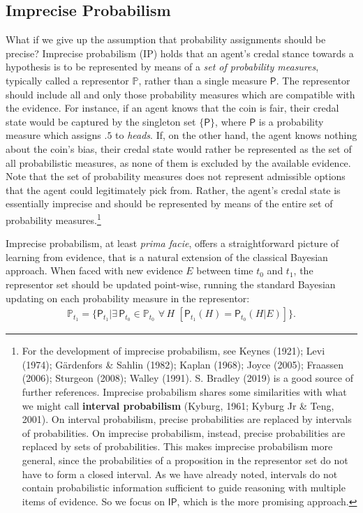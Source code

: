 \documentclass[
  10pt,
  dvipsnames,enabledeprecatedfontcommands]{scrartcl}
\newcommand{\s}[1]{\mbox{$\mathsf{#1}$}}
\begin{document}
\hypertarget{imprecise-probabilism}{%
\subsection{Imprecise Probabilism}\label{imprecise-probabilism}}

What if we give up the assumption that probability assignments should be
precise? Imprecise probabilism (\textsf{IP}) holds that an agent's
credal stance towards a hypothesis is to be represented by means of a
\emph{set of probability measures}, typically called a representor
\(\mathbb{P}\), rather than a single measure \(\mathsf{P}\). The
representor should include all and only those probability measures which
are compatible with the evidence. For instance, if an agent knows that
the coin is fair, their credal state would be captured by the singleton
set \(\{\mathsf{P}\}\), where \(\mathsf{P}\) is a probability measure
which assigns \(.5\) to \emph{heads}. If, on the other hand, the agent
knows nothing about the coin's bias, their credal state would rather be
represented as the set of all probabilistic measures, as none of them is
excluded by the available evidence. Note that the set of probability
measures does not represent admissible options that the agent could
legitimately pick from. Rather, the agent's credal state is essentially
imprecise and should be represented by means of the entire set of
probability measures.\footnote{For the development of imprecise
  probabilism, see Keynes (1921); Levi (1974); Gärdenfors \& Sahlin
  (1982); Kaplan (1968); Joyce (2005); Fraassen (2006); Sturgeon (2008);
  Walley (1991). S. Bradley (2019) is a good source of further
  references. Imprecise probabilism shares some similarities with what
  we might call \textbf{interval probabilism} (Kyburg, 1961; Kyburg Jr
  \& Teng, 2001). On interval probabilism, precise probabilities are
  replaced by intervals of probabilities. On imprecise probabilism,
  instead, precise probabilities are replaced by sets of probabilities.
  This makes imprecise probabilism more general, since the probabilities
  of a proposition in the representor set do not have to form a closed
  interval. As we have already noted, intervals do not contain
  probabilistic information sufficient to guide reasoning with multiple
  items of evidence. So we focus on \s{IP}, which is the more promising
  approach.}

Imprecise probabilism, at least \emph{prima facie}, offers a
straightforward picture of learning from evidence, that is a natural
extension of the classical Bayesian approach. When faced with new
evidence \(E\) between time \(t_0\) and \(t_1\), the representor set
should be updated point-wise, running the standard Bayesian updating on
each probability measure in the representor:
\begin{align*} \label{eq:updateRepresentor}
\mathbb{P}_{t_1} = \{\mathsf{P}_{t_1}\vert \exists\, {\mathsf{P}_{t_0} \!\in  \mathbb{P}_{t_0}}\,\, \forall\, {H}\,\, \left[\mathsf{P}_{t_1}(H)=\mathsf{P}_{t_0}(H \vert E)\right] \}.
\end{align*}
\end{document}
